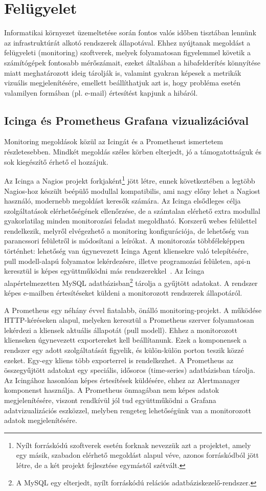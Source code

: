\section{Felügyelet}
\label{sect:monitoring}
Informatikai környezet üzemeltetése során fontos valós időben tisztában lennünk az infrastruktúrát alkotó rendszerek állapotával. Ehhez nyújtanak megoldást a felügyeleti (monitoring) szoftverek, melyek folyamatosan figyelemmel követik a számítógépek fontosabb mérőszámait, ezeket általában a hibafelderítés könnyítése miatt meghatározott ideig tárolják is, valamint gyakran képesek a metrikák vizuális megjelenítésére, emellett beállíthatjuk azt is, hogy probléma esetén valamilyen formában (pl. e-mail) értesítést kapjunk a hibáról.

\subsection{Icinga és Prometheus Grafana vizualizációval}
Monitoring megoldások közül az Icingát és a Prometheust ismertetem részletesebben. Mindkét megoldás széles körben elterjedt, jó a támogatottságuk és sok kiegészítő érhető el hozzájuk.

Az Icinga a Nagios projekt forkjaként\footnote{Nyílt forráskódú szoftverek esetén forknak nevezzük azt a projektet, amely egy másik, szabadon elérhető megoldást alapul véve, azonos forráskódból jött létre, de a két projekt fejlesztése egymástól szétvált.} jött létre, ennek következtében a legtöbb Nagios-hoz készült beépülő modullal kompatibilis, ami nagy előny lehet a Nagiost használó, modernebb megoldást keresők számára. Az Icinga elsődleges célja szolgáltatások elérhetőségének ellenőrzése, de a számtalan elérhető extra modullal gyakorlatilag minden monitorozási feladat megoldható. Korszerű webes felülettel rendelkezik, melyről elvégezhető a monitoring konfigurációja, de lehetőség van parancssori felületről is módosítani a leírókat. A monitorozás többféleképpen történhet: lehetőség van úgynevezett Icinga Agent kliensekre való telepítésére, pull modell-alapú folyamatos lekérdezésre, illetve programozási felületen, \acrshort{api}-n keresztül is képes együttműködni más rendszerekkel~\cite{IcingaApi}. Az Icinga alapértelmezetten MySQL adatbázisban\footnote{A MySQL egy elterjedt, nyílt forráskódú relációs adatbáziskezelő-rendszer.} tárolja a gyűjtött adatokat. A rendszer képes e-mailben értesítéseket küldeni a monitorozott rendszerek állapotáról.

A Prometheus egy néhány évvel fiatalabb, önálló monitoring-projekt. A működése HTTP-kéréseken alapul, melyeken keresztül a Prometheus szerver folyamatosan lekérdezi a kliensek aktuális állapotát (pull modell). Ehhez a monitorozott klienseken úgynevezett exportereket kell beállítanunk. Ezek a komponensek a rendszer egy adott szolgáltatását figyelik, és külön-külön porton teszik közzé ezeket. Egy-egy kliens több exporterrel is rendelkezhet. A Prometheus az összegyűjtött adatokat egy speciális, idősoros (time-series) adatbázisban tárolja. Az Icingához hasonlóan képes értesítések küldésére, ehhez az Alertmanager komponenst használja. A Prometheus önmagában nem képes adatok megjelenítésére, viszont rendkívül jól tud együttműködni a Grafana adatvizualizációs eszközzel, melyben rengeteg lehetőségünk van a monitorozott adatok megjelenítésére.